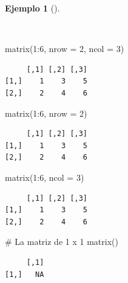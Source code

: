 \documentclass[
  a4paper,
]{scrreport}
\newenvironment{Shaded}{\begin{snugshade}}{\end{snugshade}}
\newcommand{\AttributeTok}[1]{\textcolor[rgb]{0.40,0.45,0.13}{#1}}
\newcommand{\CommentTok}[1]{\textcolor[rgb]{0.37,0.37,0.37}{#1}}
\newcommand{\DecValTok}[1]{\textcolor[rgb]{0.68,0.00,0.00}{#1}}
\newcommand{\FunctionTok}[1]{\textcolor[rgb]{0.28,0.35,0.67}{#1}}
\newcommand{\NormalTok}[1]{\textcolor[rgb]{0.00,0.23,0.31}{#1}}
\newcommand{\SpecialCharTok}[1]{\textcolor[rgb]{0.37,0.37,0.37}{#1}}
\theoremstyle{definition}
\theoremstyle{definition}
\newtheorem{example}{Ejemplo}[chapter]
\theoremstyle{remark}
\begin{document}
\begin{example}[]\protect\hypertarget{exm-creacion-matrices}{}\label{exm-creacion-matrices}

~

\begin{Shaded}
\begin{Highlighting}[]
\FunctionTok{matrix}\NormalTok{(}\DecValTok{1}\SpecialCharTok{:}\DecValTok{6}\NormalTok{, }\AttributeTok{nrow =} \DecValTok{2}\NormalTok{, }\AttributeTok{ncol =} \DecValTok{3}\NormalTok{)}
\end{Highlighting}
\end{Shaded}

\begin{verbatim}
     [,1] [,2] [,3]
[1,]    1    3    5
[2,]    2    4    6
\end{verbatim}

\begin{Shaded}
\begin{Highlighting}[]
\FunctionTok{matrix}\NormalTok{(}\DecValTok{1}\SpecialCharTok{:}\DecValTok{6}\NormalTok{, }\AttributeTok{nrow =} \DecValTok{2}\NormalTok{)}
\end{Highlighting}
\end{Shaded}

\begin{verbatim}
     [,1] [,2] [,3]
[1,]    1    3    5
[2,]    2    4    6
\end{verbatim}

\begin{Shaded}
\begin{Highlighting}[]
\FunctionTok{matrix}\NormalTok{(}\DecValTok{1}\SpecialCharTok{:}\DecValTok{6}\NormalTok{, }\AttributeTok{ncol =} \DecValTok{3}\NormalTok{)}
\end{Highlighting}
\end{Shaded}

\begin{verbatim}
     [,1] [,2] [,3]
[1,]    1    3    5
[2,]    2    4    6
\end{verbatim}

\begin{Shaded}
\begin{Highlighting}[]
\CommentTok{\# La matriz de 1 x 1 }
\FunctionTok{matrix}\NormalTok{()}
\end{Highlighting}
\end{Shaded}

\begin{verbatim}
     [,1]
[1,]   NA
\end{verbatim}

\end{example}
\end{document}
